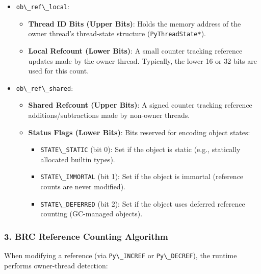 \begin{itemize}
\tightlist
\item
  \passthrough{\lstinline!ob\_ref\_local!}:

  \begin{itemize}
  \tightlist
  \item
    \textbf{Thread ID Bits (Upper Bits)}: Holds the memory address of
    the owner thread's thread-state structure
    (\passthrough{\lstinline!PyThreadState*!}).
  \item
    \textbf{Local Refcount (Lower Bits)}: A small counter tracking
    reference updates made by the owner thread. Typically, the lower 16
    or 32 bits are used for this count.
  \end{itemize}
\item
  \passthrough{\lstinline!ob\_ref\_shared!}:

  \begin{itemize}
  \tightlist
  \item
    \textbf{Shared Refcount (Upper Bits)}: A signed counter tracking
    reference additions/subtractions made by non-owner threads.
  \item
    \textbf{Status Flags (Lower Bits)}: Bits reserved for encoding
    object states:

    \begin{itemize}
    \tightlist
    \item
      \passthrough{\lstinline!STATE\_STATIC!} (bit 0): Set if the object
      is static (e.g., statically allocated builtin types).
    \item
      \passthrough{\lstinline!STATE\_IMMORTAL!} (bit 1): Set if the
      object is immortal (reference counts are never modified).
    \item
      \passthrough{\lstinline!STATE\_DEFERRED!} (bit 2): Set if the
      object uses deferred reference counting (GC-managed objects).
    \end{itemize}
  \end{itemize}
\end{itemize}

\hypertarget{brc-reference-counting-algorithm}{%
\subsubsection{3. BRC Reference Counting
Algorithm}\label{brc-reference-counting-algorithm}}

When modifying a reference (via \passthrough{\lstinline!Py\_INCREF!} or
\passthrough{\lstinline!Py\_DECREF!}), the runtime performs owner-thread
detection:

